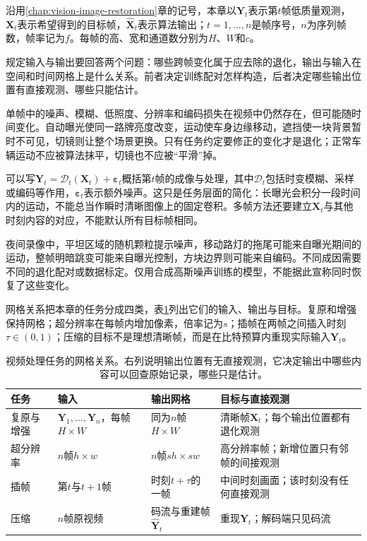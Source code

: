 沿用\ref{chap:vision-image-restoration}章的记号，本章以$\bm{Y}_t$表示第$t$帧低质量观测，$\bm{X}_t$表示希望得到的目标帧，$\widehat{\bm{X}}_t$表示算法输出；$t=1,\dots,n$是帧序号，$n$为序列帧数，帧率记为$f$。每帧的高、宽和通道数分别为$H$、$W$和$c$。

\label{sec:vision-video-degradation}
规定输入与输出要回答两个问题：哪些跨帧变化属于应去除的退化，输出与输入在空间和时间网格上是什么关系。前者决定训练配对怎样构造，后者决定哪些输出位置有直接观测、哪些只能估计。

单帧中的噪声、模糊、低照度、分辨率和编码损失在视频中仍然存在，但可能随时间变化。自动曝光使同一路牌亮度改变，运动使车身边缘移动，遮挡使一块背景暂时不可见，切镜则让整个场景更换。只有任务约定要修正的变化才是退化；正常车辆运动不应被算法抹平，切镜也不应被“平滑”掉。

可以写$\bm{Y}_t=\mathcal{D}_t(\bm{X}_t)+\bm{\varepsilon}_t$概括第$t$帧的成像与处理，其中$\mathcal{D}_t$包括时变模糊、采样或编码等作用，$\bm{\varepsilon}_t$表示额外噪声。这只是任务层面的简化：长曝光会积分一段时间内的运动，不能总当作瞬时清晰图像上的固定卷积。多帧方法还要建立$\bm{X}_t$与其他时刻内容的对应，不能默认所有目标帧相同。

夜间录像中，平坦区域的随机颗粒提示噪声，移动路灯的拖尾可能来自曝光期间的运动，整帧明暗跳变可能来自曝光控制，方块边界则可能来自编码。不同成因需要不同的退化配对或数据标定。仅用合成高斯噪声训练的模型，不能据此宣称同时恢复了这些变化。

网格关系把本章的任务分成四类，表\ref{tab:vision-video-task-targets}列出它们的输入、输出与目标。复原和增强保持网格；超分辨率在每帧内增加像素，倍率记为$s$；插帧在两帧之间插入时刻$\tau\in(0,1)$；压缩的目标不是理想清晰帧，而是在比特预算内重现实际输入$\bm{Y}_t$。

\begin{table}[htbp]
  \centering
  \begin{tabularx}{\linewidth}{@{}lXXX@{}}
    \toprule
    任务 & 输入 & 输出网格 & 目标与直接观测\\
    \midrule
    复原与增强 & $\bm{Y}_{1},\dots,\bm{Y}_{n}$，每帧$H\times W$ & 同为$n$帧$H\times W$ & 清晰帧$\bm{X}_t$；每个输出位置都有退化观测\\
    超分辨率 & $n$帧$h\times w$ & $n$帧$sh\times sw$ & 高分辨率帧；新增位置只有邻帧的间接观测\\
    插帧 & 第$t$与$t+1$帧 & 时刻$t+\tau$的一帧 & 中间时刻画面；该时刻没有任何直接观测\\
    压缩 & $n$帧原视频 & 码流与重建帧$\widehat{\bm{Y}}_t$ & 重现$\bm{Y}_t$；解码端只见码流\\
    \bottomrule
  \end{tabularx}
  \caption{视频处理任务的网格关系。右列说明输出位置有无直接观测，它决定输出中哪些内容可以回查原始记录，哪些只是估计。}
  \label{tab:vision-video-task-targets}
\end{table}

